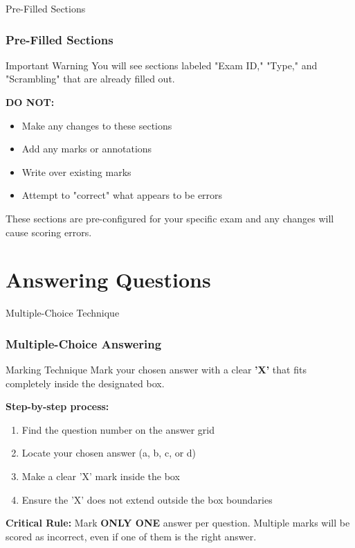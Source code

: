 \documentclass{beamer}
\begin{document}
\begin{frame}{Pre-Filled Sections}
\frametitle{Pre-Filled Sections}
\begin{block}{Important Warning}
You will see sections labeled "Exam ID," "Type," and "Scrambling" that are already filled out.
\end{block}

\textbf{DO NOT:}
\begin{itemize}
\item Make any changes to these sections
\item Add any marks or annotations
\item Write over existing marks
\item Attempt to "correct" what appears to be errors
\end{itemize}

These sections are pre-configured for your specific exam and any changes will cause scoring errors.

\end{frame}

\section{Answering Questions}

\begin{frame}{Multiple-Choice Technique}
\frametitle{Multiple-Choice Answering}
\begin{block}{Marking Technique}
Mark your chosen answer with a clear \textbf{'X'} that fits completely inside the designated box.
\end{block}

\textbf{Step-by-step process:}
\begin{enumerate}
\item Find the question number on the answer grid
\item Locate your chosen answer (a, b, c, or d)
\item Make a clear 'X' mark inside the box
\item Ensure the 'X' does not extend outside the box boundaries
\end{enumerate}

\textbf{Critical Rule:} Mark \textbf{ONLY ONE} answer per question. Multiple marks will be scored as incorrect, even if one of them is the right answer.
\end{frame}
\end{document}
